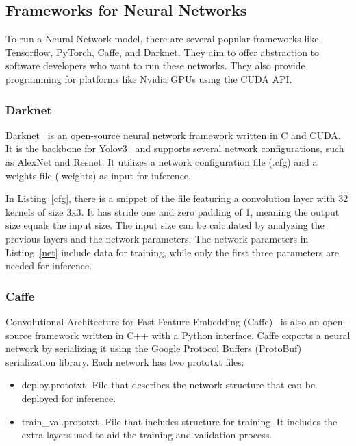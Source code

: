 
 \subsection{Frameworks for Neural Networks}
 \label{section:Darknet}

To run a Neural Network model, there are several popular frameworks like
Tensorflow, PyTorch, Caffe, and Darknet.  They aim to offer abstraction
to software developers who want to run these networks. They also provide
programming for platforms like Nvidia GPUs using the CUDA API.

\subsubsection{Darknet}

Darknet~\cite{Darknet} is an open-source neural network framework written in C
and CUDA. It is the backbone for Yolov3~\cite{yolov3} and supports
several network configurations, such as AlexNet and Resnet.  It
utilizes a network configuration file (.cfg) and a weights file (.weights) as
input for inference.



In Listing~\ref{cfg}, there is a snippet of the file featuring a convolution
layer with 32 kernels of size 3x3. It has stride one and zero padding of 1,
meaning the output size equals the input size. The input size can be
calculated by analyzing the previous layers and the network parameters. The
network parameters in Listing~\ref{net} include data for training, while only
the first three parameters are needed for inference.




\subsubsection{Caffe}

Convolutional Architecture for Fast Feature Embedding (Caffe)~\cite{caffe} is
also an open-source framework written in C++ with a Python interface.  Caffe
exports a neural network by serializing it using the Google Protocol Buffers
(ProtoBuf) serialization library. Each network has two prototxt files:
\begin{itemize}
    \item deploy.prototxt- File that describes the network structure that
      can be deployed for inference.
    \item train\_val.prototxt- File that includes structure for training.  It
      includes the extra layers used to aid the training and validation process.
\end{itemize}

